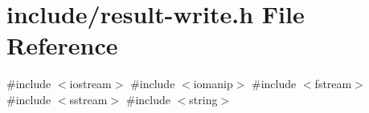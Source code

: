 \hypertarget{result-write_8h}{}\section{include/result-\/write.h File Reference}
\label{result-write_8h}
{\ttfamily \#include $<$iostream$>$}\newline
{\ttfamily \#include $<$iomanip$>$}\newline
{\ttfamily \#include $<$fstream$>$}\newline
{\ttfamily \#include $<$sstream$>$}\newline
{\ttfamily \#include $<$string$>$}\newline
